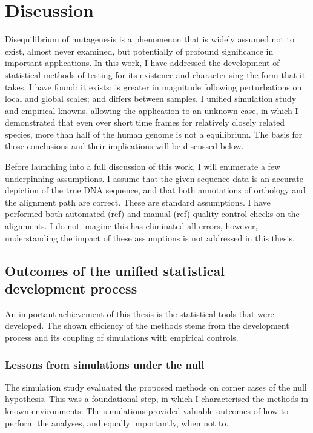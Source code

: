 \chapter{Discussion}

Disequilibrium of mutagenesis is a phenomenon that is widely assumed not to exist, almost never examined, but potentially of profound significance in important applications. In this work, I have addressed the development of statistical methods of testing for its existence and characterising the form that it takes. I have found: it exists; is greater in magnitude following perturbations on local and global scales; and differs between samples. I unified simulation study and empirical knowns, allowing the application to an unknown case, in which I demonstrated that even over short time frames for relatively closely related species, more than half of the human genome is not a equilibrium. The basis for those conclusions and their implications will be discussed below. 

Before launching into a full discussion of this work, I will enumerate a few underpinning assumptions. I assume that the given sequence data is an accurate depiction of the true DNA sequence, and that both annotations of orthology and the alignment path are correct. These are standard assumptions. I have performed both automated (ref) and manual (ref) quality control checks on the alignments. I do not imagine this has eliminated all errors, however, understanding the impact of these assumptions is not addressed in this thesis. 

\section{Outcomes of the unified statistical development process}
An important achievement of this thesis is the statistical tools that were developed. The shown efficiency of the methods stems from the development process and its coupling of simulations with empirical controls. 

\subsection{Lessons from simulations under the null}
The simulation study evaluated the proposed methods on corner cases of the null hypothesis. This was a foundational step, in which I characterised the methods in known environments. The simulations provided valuable outcomes of how to perform the analyses, and equally importantly, when not to. 


